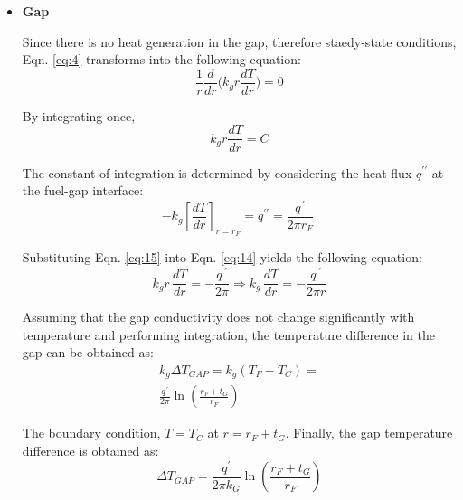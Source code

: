 \documentclass[12pt]{article}
\begin{document}
\begin{multicols}{2}

\begin{itemize}
    \item[] \textbf{Gap}

    Since there is no heat generation in the gap, therefore staedy-state conditions, Eqn. \ref{eq:4} transforms into the following equation:
    \begin{equation}\label{eq:13}
        {\frac{1}{r}}{\frac{d}{d r}}{\Bigg(}k_{g}r{\frac{d T}{d r}}{\Bigg)}=0
    \end{equation}
    
By integrating once,
\begin{equation}\label{eq:14}
    k_{g}r{\frac{d T}{d r}}=C
\end{equation}

The constant of integration is determined by considering the heat flux $q^{\prime \prime}$ at the fuel-gap
interface:
\begin{equation}\label{eq:15}
    -k_{g}\left[\frac{d T}{d r}\right]_{r=r_{F}}=q^{\prime \prime}=\frac{q^{\,\prime}}{2\pi r_{F}}\;
\end{equation}

Substituting Eqn. \ref{eq:15} into Eqn. \ref{eq:14} yields the following equation:
\begin{equation}\label{eq:16}
    k_{g}r\,\frac{d T}{d r}=-\frac{q^{\;\prime}}{2\pi}\Rightarrow k_{g}\,\frac{d T}{d r}=-\frac{q^{\;\prime}}{2\pi r}
\end{equation}

Assuming that the gap conductivity does not change significantly with temperature and performing integration, the temperature difference in the gap can be obtained as:
\begin{equation}\label{eq:17}
\begin{gathered}
        k_{g}\Delta T_{G A P}=k_{g}\left(T_{F}-T_{C}\right)= \\ {\frac{q^{\,\prime}}{2\pi}}\ln\left({\frac{r_{F}+t_{G}}{r_{F}}}\right)    
\end{gathered}
\end{equation}

The boundary condition, $T=T_C$ at $r=r_F+t_G$. Finally, the gap temperature difference is obtained as:
\begin{equation}\label{eq:18}
    \Delta T_{G A P}={\frac{q^{'}}{2\pi k_{G}}}\ln\left({\frac{r_{F}+t_{G}}{r_{F}}}\right)
\end{equation}


\end{itemize}
\end{multicols}
\end{document}

